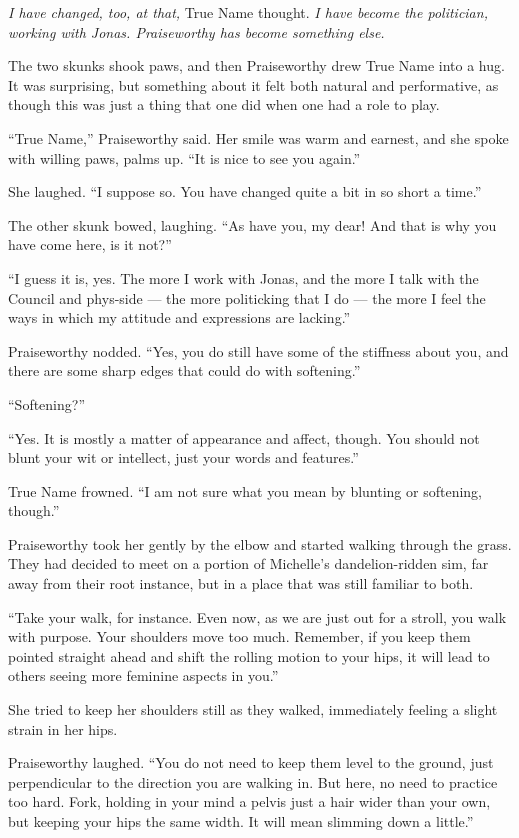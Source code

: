 \emph{I have changed, too, at that,} True Name thought. \emph{I have become the politician, working with Jonas. Praiseworthy has become something else.}

The two skunks shook paws, and then Praiseworthy drew True Name into a hug. It was surprising, but something about it felt both natural and performative, as though this was just a thing that one did when one had a role to play.

``True Name,'' Praiseworthy said. Her smile was warm and earnest, and she spoke with willing paws, palms up. ``It is nice to see you again.''

She laughed. ``I suppose so. You have changed quite a bit in so short a time.''

The other skunk bowed, laughing. ``As have you, my dear! And that is why you have come here, is it not?''

``I guess it is, yes. The more I work with Jonas, and the more I talk with the Council and phys-side — the more politicking that I do — the more I feel the ways in which my attitude and expressions are lacking.''

Praiseworthy nodded. ``Yes, you do still have some of the stiffness about you, and there are some sharp edges that could do with softening.''

``Softening?''

``Yes. It is mostly a matter of appearance and affect, though. You should not blunt your wit or intellect, just your words and features.''

True Name frowned. ``I am not sure what you mean by blunting or softening, though.''

Praiseworthy took her gently by the elbow and started walking through the grass. They had decided to meet on a portion of Michelle's dandelion-ridden sim, far away from their root instance, but in a place that was still familiar to both.

``Take your walk, for instance. Even now, as we are just out for a stroll, you walk with purpose. Your shoulders move too much. Remember, if you keep them pointed straight ahead and shift the rolling motion to your hips, it will lead to others seeing more feminine aspects in you.''

She tried to keep her shoulders still as they walked, immediately feeling a slight strain in her hips.

Praiseworthy laughed. ``You do not need to keep them level to the ground, just perpendicular to the direction you are walking in. But here, no need to practice too hard. Fork, holding in your mind a pelvis just a hair wider than your own, but keeping your hips the same width. It will mean slimming down a little.''

